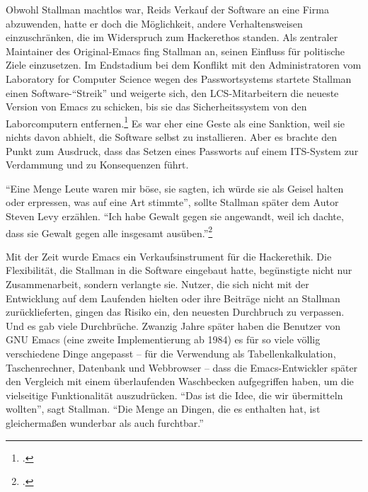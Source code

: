 Obwohl Stallman machtlos war, Reids Verkauf der Software an eine Firma abzuwenden, hatte er doch die Möglichkeit, andere Verhaltensweisen einzuschränken, die im Widerspruch zum Hackerethos standen. Als zentraler Maintainer des Original-Emacs fing Stallman an, seinen Einfluss für politische Ziele einzusetzen. Im Endstadium bei dem Konflikt mit den Administratoren vom Laboratory for Computer Science wegen des Passwortsystems startete Stallman einen Software-"`Streik"' und weigerte sich, den LCS-Mitarbeitern die neueste Version von Emacs zu schicken, bis sie das Sicherheitssystem von den Laborcomputern entfernen.\footcite[Vgl.][S.\,419]{hackers} Es war eher eine Geste als eine Sanktion, weil sie nichts davon abhielt, die Software selbst zu installieren. Aber es brachte den Punkt zum Ausdruck, dass das Setzen eines Passworts auf einem ITS-System zur Verdammung und zu Konsequenzen führt.

"`Eine Menge Leute waren mir böse, sie sagten, ich würde sie als Geisel halten oder erpressen, was auf eine Art stimmte"', sollte Stallman später dem Autor Steven Levy erzählen. "`Ich habe Gewalt gegen sie angewandt, weil ich dachte, dass sie Gewalt gegen alle insgesamt ausüben."'\footcite[][]{hackers}

Mit der Zeit wurde Emacs ein Verkaufsinstrument für die Hackerethik. Die Flexibilität, die Stallman in die Software eingebaut hatte, begünstigte nicht nur Zusammenarbeit, sondern verlangte sie. Nutzer, die sich nicht mit der Entwicklung auf dem Laufenden hielten oder ihre Beiträge nicht an Stallman zurücklieferten, gingen das Risiko ein, den neuesten Durchbruch zu verpassen. Und es gab viele Durchbrüche. Zwanzig Jahre später haben die Benutzer von GNU Emacs (eine zweite Implementierung ab 1984) es für so viele völlig verschiedene Dinge angepasst – für die Verwendung als Tabellenkalkulation, Taschenrechner, Datenbank und Webbrowser – dass die Emacs-Entwickler später den Vergleich mit einem überlaufenden Waschbecken aufgegriffen haben, um die vielseitige Funktionalität auszudrücken. "`Das ist die Idee, die wir übermitteln wollten"', sagt Stallman. "`Die Menge an Dingen, die es enthalten hat, ist gleichermaßen wunderbar als auch furchtbar."'

